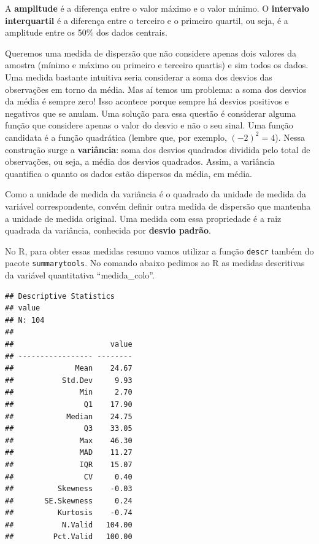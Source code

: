 \documentclass[
]{book}
\newenvironment{Shaded}{\begin{snugshade}}{\end{snugshade}}
\newcommand{\KeywordTok}[1]{\textcolor[rgb]{0.13,0.29,0.53}{\textbf{#1}}}
\newcommand{\NormalTok}[1]{#1}
\newcommand{\OperatorTok}[1]{\textcolor[rgb]{0.81,0.36,0.00}{\textbf{#1}}}
\begin{document}
A \textbf{amplitude} é a diferença entre o valor máximo e o valor mínimo. O \textbf{intervalo interquartil} é a diferença entre o terceiro e o primeiro quartil, ou seja, é a amplitude entre os 50\% dos dados centrais.

Queremos uma medida de dispersão que não considere apenas dois valores da amostra (mínimo e máximo ou primeiro e terceiro quartis) e sim todos os dados. Uma medida bastante intuitiva seria considerar a soma dos desvios das observações em torno da média. Mas aí temos um problema: a soma dos desvios da média é sempre zero! Isso acontece porque sempre há desvios positivos e negativos que se anulam. Uma solução para essa questão é considerar alguma função que considere apenas o valor do desvio e não o seu sinal. Uma função candidata é a função quadrática (lembre que, por exemplo, \((-2)^2=4\)). Nessa construção surge a \textbf{variância}: soma dos desvios quadrados dividida pelo total de observações, ou seja, a média dos desvios quadrados. Assim, a variância quantifica o quanto os dados estão dispersos da média, em média.

Como a unidade de medida da variância é o quadrado da unidade de medida da variável correspondente, convém definir outra medida de dispersão que mantenha a unidade de medida original. Uma medida com essa propriedade é a raiz quadrada da variância, conhecida por \textbf{desvio padrão}.

No R, para obter essas medidas resumo vamos utilizar a função \texttt{descr} também do pacote \texttt{summarytools}. No comando abaixo pedimos ao R as medidas descritivas da variável quantitativa ``medida\_colo''.

\begin{Shaded}
\end{Shaded}

\begin{verbatim}
## Descriptive Statistics  
## value  
## N: 104  
## 
##                      value
## ----------------- --------
##              Mean    24.67
##           Std.Dev     9.93
##               Min     2.70
##                Q1    17.90
##            Median    24.75
##                Q3    33.05
##               Max    46.30
##               MAD    11.27
##               IQR    15.07
##                CV     0.40
##          Skewness    -0.03
##       SE.Skewness     0.24
##          Kurtosis    -0.74
##           N.Valid   104.00
##         Pct.Valid   100.00
\end{verbatim}
\end{document}
